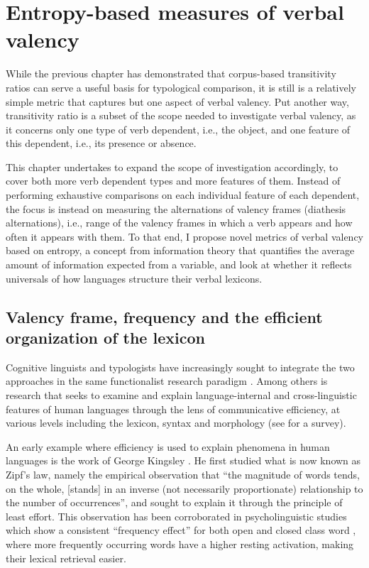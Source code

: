 \chapter{Entropy-based measures of verbal valency}\label{chapter:entropy}

While the previous chapter has demonstrated that corpus-based transitivity ratios can serve a useful basis for typological comparison, it is still is a relatively simple metric that captures but one aspect of verbal valency. Put another way, transitivity ratio is a subset of the scope needed to investigate verbal valency, as it concerns only one type of verb dependent, i.e., the object, and one feature of this dependent, i.e., its presence or absence. 

This chapter undertakes to expand the scope of investigation accordingly, to cover both more verb dependent types and more features of them. Instead of performing exhaustive comparisons on each individual feature of each dependent, the focus is instead on measuring the alternations of valency frames (diathesis alternations), i.e., range of the valency frames in which a verb appears and how often it appears with them. To that end, I propose novel metrics of verbal valency based on entropy, a concept from information theory that quantifies the average amount of information expected from a variable, and look at whether it reflects universals of how languages structure their verbal lexicons.


\section{Valency frame, frequency and the efficient organization of the lexicon}

Cognitive linguists and typologists have increasingly sought to integrate the two approaches in the same functionalist research paradigm \citep{croft2016}. Among others is research that seeks to examine and explain language-internal and cross-linguistic features of human languages through the lens of communicative efficiency, at various levels including the lexicon, syntax and morphology (see \citealp{gibson2019} for a survey). 

An early example where efficiency is used to explain phenomena in human languages is the work of George Kingsley \citet{zipf1935,zipf1949}. He first studied what is now known as Zipf's law, namely the empirical observation that ``the magnitude of words tends, on the whole, [stands] in an inverse (not necessarily proportionate) relationship to the number of occurrences'', and sought to explain it through the principle of least effort. This observation has been corroborated in psycholinguistic studies which show a consistent ``frequency effect'' for both open and closed class word \citep{segui1982,marslen-wilson1990}, where more frequently occurring words have a higher resting activation, making their lexical retrieval easier. 

